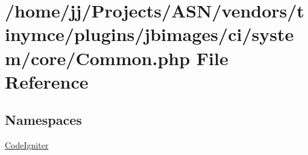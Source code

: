 \hypertarget{_common_8php}{}\section{/home/jj/\+Projects/\+A\+S\+N/vendors/tinymce/plugins/jbimages/ci/system/core/\+Common.php File Reference}
\label{_common_8php}
\subsection*{Namespaces}
\begin{DoxyCompactItemize}
\item 
 \hyperlink{namespace_code_igniter}{Code\+Igniter}
\end{DoxyCompactItemize}
